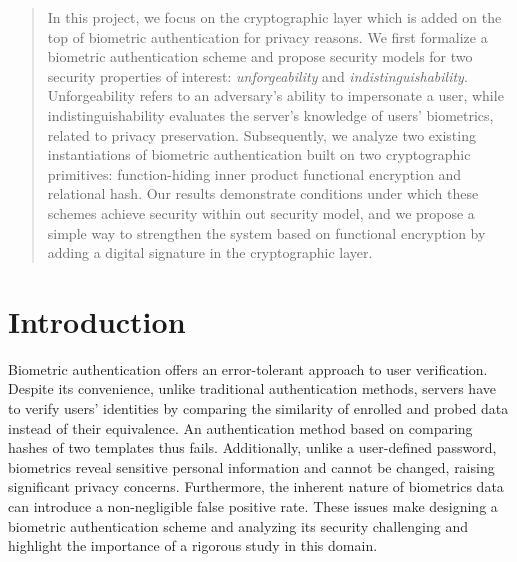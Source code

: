 







\maketitle


\pagestyle{fancy}
\fancyhf{}
\fancyfoot[C]{\thepage}





\begin{abstract}
\label{sec:abstract}

In this project, we focus on the cryptographic layer which is added on the top of biometric authentication for privacy reasons. We first formalize a biometric authentication scheme and propose security models for two security properties of interest: \emph{unforgeability} and \emph{indistinguishability}. Unforgeability refers to an adversary's ability to impersonate a user, while indistinguishability evaluates the server's knowledge of users' biometrics, related to privacy preservation. Subsequently, we analyze two existing instantiations of biometric authentication built on two cryptographic primitives: function-hiding inner product functional encryption and relational hash. Our results demonstrate conditions under which these schemes achieve security within out security model, and we propose a simple way to strengthen the system based on functional encryption by adding a digital signature in the cryptographic layer.

\end{abstract}


\section{Introduction}

Biometric authentication offers an error-tolerant approach to user verification. Despite its convenience, unlike traditional authentication methods, servers have to verify users' identities by comparing the similarity of enrolled and probed data instead of their equivalence. An authentication method based on comparing hashes of two templates thus fails. Additionally, unlike a user-defined password, biometrics reveal sensitive personal information and cannot be changed, raising significant privacy concerns. Furthermore, the inherent nature of biometrics data can introduce a non-negligible false positive rate. These issues make designing a biometric authentication scheme and analyzing its security challenging and highlight the importance of a rigorous study in this domain.

